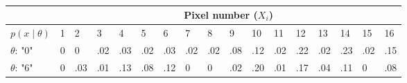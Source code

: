\documentclass{tufte-book}
\theoremstyle{mytheoremstyle}
\theoremstyle{mylemstyle}
\theoremstyle{mydefstyle}
\begin{document}
\begin{table}
\centering
\caption{}
\label{my-label}
\begin{tabular}{|ll|l|l|l|l|l|l|l|l|l|l|l|l|l|l|l|}
\hline
                                      & \multicolumn{16}{c|}{Pixel number ($X_i$)}                            \\ \hline
\multicolumn{1}{|l||}{$p(x\mid \theta)$} & 1 & 2 & 3 & 4 & 5 & 6 & 7 & 8 & 9 & 10 & 11 & 12 & 13 & 14 & 15 & 16 \\ \hline
\multicolumn{1}{|l||}{$\theta$: "0"}     & 0 & 0  & .02 & .03  & .02 & .03 & .02 & .02 & .08 & .12 & .02 & .22 & .02 & .23 &.02&.15   \\ \hline
\multicolumn{1}{|l||}{$\theta$: "6"}     & 0 & .03 & .01 & .13 & .08 & .12 &0& 0& .02 & .20 & .01 & .17 & .04 & .11 & 0 & .08  \\ \hline
\end{tabular}
\end{table}
\end{document}
